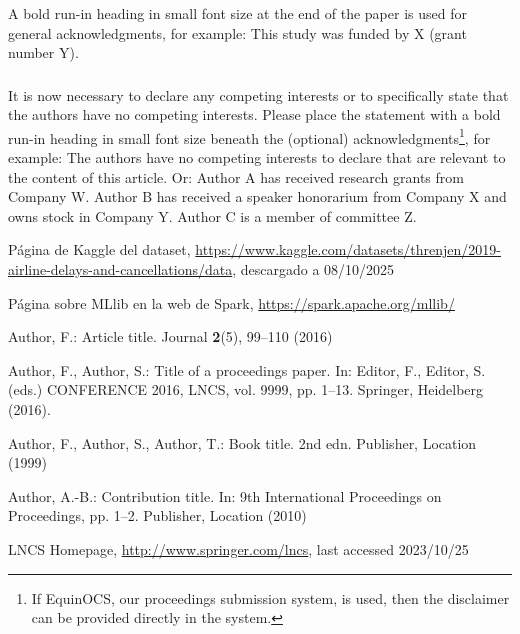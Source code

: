 \documentclass[runningheads]{llncs}
\begin{document}
\begin{credits}
\subsubsection{\ackname} A bold run-in heading in small font size at the end of the paper is
used for general acknowledgments, for example: This study was funded
by X (grant number Y).

\subsubsection{\discintname}
It is now necessary to declare any competing interests or to specifically
state that the authors have no competing interests. Please place the
statement with a bold run-in heading in small font size beneath the
(optional) acknowledgments\footnote{If EquinOCS, our proceedings submission
system, is used, then the disclaimer can be provided directly in the system.},
for example: The authors have no competing interests to declare that are
relevant to the content of this article. Or: Author A has received research
grants from Company W. Author B has received a speaker honorarium from
Company X and owns stock in Company Y. Author C is a member of committee Z.
\end{credits}
%
%
%
% 
% 
%
\begin{thebibliography}{8}
Página de Kaggle del dataset, \url{https://www.kaggle.com/datasets/threnjen/2019-airline-delays-and-cancellations/data}, descargado a 08/10/2025

Página sobre MLlib en la web de Spark, \url{https://spark.apache.org/mllib/}

Author, F.: Article title. Journal \textbf{2}(5), 99--110 (2016)

Author, F., Author, S.: Title of a proceedings paper. In: Editor,
F., Editor, S. (eds.) CONFERENCE 2016, LNCS, vol. 9999, pp. 1--13.
Springer, Heidelberg (2016). 

Author, F., Author, S., Author, T.: Book title. 2nd edn. Publisher,
Location (1999)

Author, A.-B.: Contribution title. In: 9th International Proceedings
on Proceedings, pp. 1--2. Publisher, Location (2010)

LNCS Homepage, \url{http://www.springer.com/lncs}, last accessed 2023/10/25
\end{thebibliography}
\end{document}

